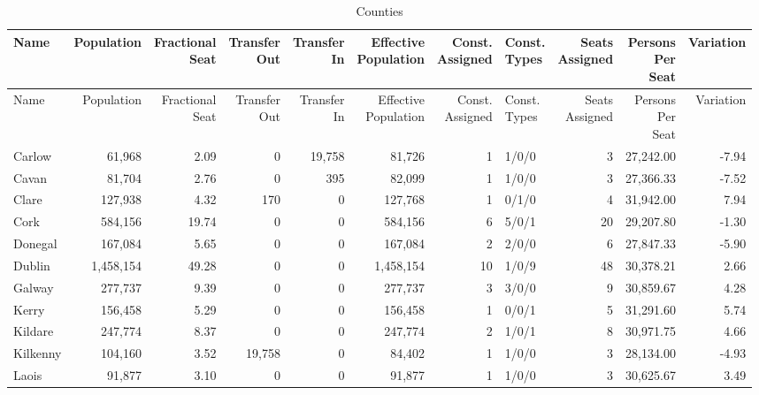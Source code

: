 \documentclass[a4paper]{article}
\begin{document}
\begin{longtable}{lrrrrrrlrrr}
\caption{Counties}
\\ \toprule
Name &Population &\shortstack{Fractional\\Seat} &\shortstack{Transfer\\Out} &\shortstack{Transfer\\In} &\shortstack{Effective\\Population} &\shortstack{Const.\\Assigned} &\shortstack{Const.\\Types} &\shortstack{Seats\\Assigned} &\shortstack{Persons\\Per\\Seat} &Variation \\ \midrule
\endfirsthead
\toprule
Name &Population &\shortstack{Fractional\\Seat} &\shortstack{Transfer\\Out} &\shortstack{Transfer\\In} &\shortstack{Effective\\Population} &\shortstack{Const.\\Assigned} &\shortstack{Const.\\Types} &\shortstack{Seats\\Assigned} &\shortstack{Persons\\Per\\Seat} &Variation \\ \midrule
\endhead
\bottomrule
\endfoot
Carlow&61,968& 2.09&0&19,758&81,726&1&1/0/0&3&27,242.00&-7.94\\ 
Cavan&81,704& 2.76&0&395&82,099&1&1/0/0&3&27,366.33&-7.52\\ 
Clare&127,938& 4.32&170&0&127,768&1&0/1/0&4&31,942.00& 7.94\\ 
Cork&584,156&19.74&0&0&584,156&6&5/0/1&20&29,207.80&-1.30\\ 
Donegal&167,084& 5.65&0&0&167,084&2&2/0/0&6&27,847.33&-5.90\\ 
Dublin&1,458,154&49.28&0&0&1,458,154&10&1/0/9&48&30,378.21& 2.66\\ 
Galway&277,737& 9.39&0&0&277,737&3&3/0/0&9&30,859.67& 4.28\\ 
Kerry&156,458& 5.29&0&0&156,458&1&0/0/1&5&31,291.60& 5.74\\ 
Kildare&247,774& 8.37&0&0&247,774&2&1/0/1&8&30,971.75& 4.66\\ 
Kilkenny&104,160& 3.52&19,758&0&84,402&1&1/0/0&3&28,134.00&-4.93\\ 
Laois&91,877& 3.10&0&0&91,877&1&1/0/0&3&30,625.67& 3.49\\ 

\end{longtable}
\end{document}
